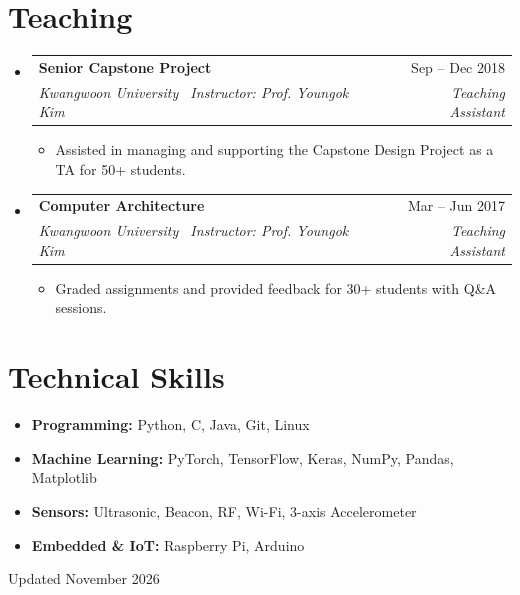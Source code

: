\documentclass[letterpaper,11pt]{article}
\makeatletter
\newcommand{\resumeItem}[1]{\item\small{#1\vspace{-2pt}}}
\newcommand{\resumeSubheading}[4]{%
  \Needspace{5\baselineskip}
  \vspace{-2pt}\item
  \begin{tabularx}{\linewidth}[t]{@{}Xr@{}}
    \textbf{#1} & #2 \\
    \textit{\small #3} & \textit{\small #4} \\
  \end{tabularx}\vspace{-7pt}
}
\newcommand{\resumeSubHeadingListStart}{\begin{itemize}[leftmargin=0.15in,label={},itemsep=8pt]}
\newcommand{\resumeSubHeadingListEnd}{\end{itemize}}
\newcommand{\resumeItemListStart}{\begin{itemize}[leftmargin=0.18in,label=\textbullet,itemsep=2pt,topsep=5pt]}
\newcommand{\resumeItemListEnd}{\end{itemize}\vspace{-5pt}}
\makeatother
\begin{document}
\section{Teaching}
\resumeSubHeadingListStart
  \resumeSubheading
    {Senior Capstone Project}{Sep -- Dec 2018}
    {Kwangwoon University \textbar\ Instructor: Prof. Youngok Kim}{Teaching Assistant}
    \resumeItemListStart
      \resumeItem{Assisted in managing and supporting the Capstone Design Project as a TA for 50+ students.}
    \resumeItemListEnd
  \resumeSubheading
    {Computer Architecture}{Mar -- Jun 2017}
    {Kwangwoon University \textbar\ Instructor: Prof. Youngok Kim}{Teaching Assistant}
    \resumeItemListStart
      \resumeItem{Graded assignments and provided feedback for 30+ students with Q\&A sessions.}
    \resumeItemListEnd
\resumeSubHeadingListEnd

\section{Technical Skills}
\begin{itemize}[leftmargin=0.15in,label={},itemsep=3pt]
  \small
  \item \textbf{Programming:} Python, C, Java, Git, Linux
  \item \textbf{Machine Learning:} PyTorch, TensorFlow, Keras, NumPy, Pandas, Matplotlib
  \item \textbf{Sensors:} Ultrasonic, Beacon, RF, Wi-Fi, 3-axis Accelerometer
  \item \textbf{Embedded \& IoT:} Raspberry Pi, Arduino
\end{itemize}

\vfill
\hfill{\scriptsize Updated November 2026}
\end{document}
